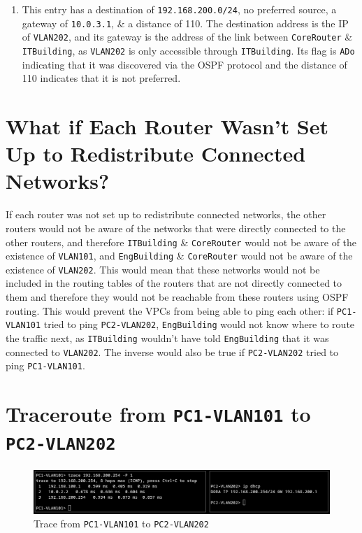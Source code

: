\documentclass[a4paper]{article}
\begin{document}
\begin{enumerate}
    \item   This entry has a destination of \verb|192.168.200.0/24|, no preferred source, a
            gateway of \verb|10.0.3.1|, \& a distance of 110. 
            The destination address is the IP of \verb|VLAN202|, and its gateway is the address of the link between 
            \verb|CoreRouter| \& \verb|ITBuilding|, as \verb|VLAN202| is only accessible through \verb|ITBuilding|.
            Its flag is \verb|ADo| indicating that it was discovered via the OSPF protocol and the distance of 110
            indicates that it is not preferred.
\end{enumerate}

\section{What if Each Router Wasn't Set Up to Redistribute Connected Networks?}
If each router was not set up to redistribute connected networks, the other routers would not be aware of the networks 
that were directly connected to the other routers, and therefore \verb|ITBuilding| \& \verb|CoreRouter| would not be aware 
of the existence of \verb|VLAN101|, and \verb|EngBuilding| \& \verb|CoreRouter| would not be aware of the existence of 
\verb|VLAN202|.
This would mean that these networks would not be included in the routing tables of the routers that are not directly 
connected to them and therefore they would not be reachable from these routers using OSPF routing.
This would prevent the VPCs from being able to ping each other: if \verb|PC1-VLAN101| tried to ping \verb|PC2-VLAN202|, 
\verb|EngBuilding| would not know where to route the traffic next, as \verb|ITBuilding| wouldn't have told \verb|EngBuilding| 
that it was connected to \verb|VLAN202|.
The inverse would also be true if \verb|PC2-VLAN202| tried to ping \verb|PC1-VLAN101|.

\section{Traceroute from \texttt{PC1-VLAN101} to \texttt{PC2-VLAN202}}
\begin{figure}[H]
    \centering
    \includegraphics[width=\textwidth]{./images/trace_pcs.png}
    \caption{Trace from \texttt{PC1-VLAN101} to \texttt{PC2-VLAN202}}
\end{figure}
\end{document}
